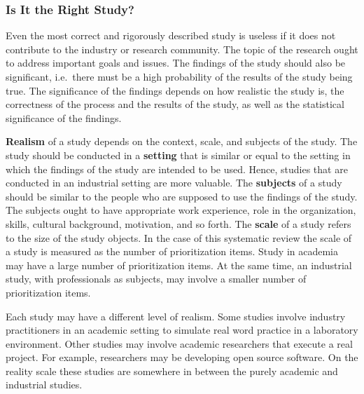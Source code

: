 \subsubsection{Is It the Right Study?}

Even the most correct and rigorously described study is useless if it does not contribute to the industry or research community. The topic of the research ought to address important goals and issues. The findings of the study should also be significant, i.e.\ there must be a high probability of the results of the study being true. The significance of the findings depends on how realistic the study is, the correctness of the process and the results of the study, as well as the statistical significance of the findings.

\textbf{Realism} of a study depends on the context, scale, and subjects of the study.
The study should be conducted in a \textbf{setting} that is similar or equal to the setting in which the findings of the study are intended to be used. Hence, studies that are conducted in an industrial setting are more valuable.
The \textbf{subjects} of a study should be similar to the people who are supposed to use the findings of the study. The subjects ought to have appropriate work experience, role in the organization, skills, cultural background, motivation, and so forth.
The \textbf{scale} of a study refers to the size of the study objects. 
In the case of this systematic review the scale of a study is measured as the number of prioritization items.
Study in academia may have a large number of prioritization items. At the same time, an industrial study, with professionals as subjects, may involve a smaller number of prioritization items.

Each study may have a different level of realism. Some studies involve industry practitioners in an academic setting to simulate real word practice in a laboratory environment.
Other studies may involve academic researchers that execute a real project. For example, researchers may be developing open source software.
On the reality scale these studies are somewhere in between the purely academic and industrial studies.

